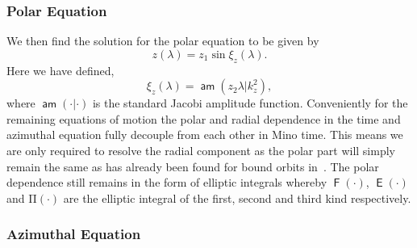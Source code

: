\documentclass[12pt, amsmath]{revtex4-2}
\newcommand\lam{\lambda}
\DeclareMathOperator{\am}{\mathsf{am}}
\newcommand{\elE}{\operatorname{\mathsf{E}}}%
\newcommand{\elF}{\operatorname{\mathsf{F}}}%
\begin{document}
\subsubsection{Polar Equation}
We then find the solution for the polar equation to be given by 
\begin{equation}\label{Eq:ISSOPolar}
    z(\lambda) = z_1 \sin{\xi_z(\lam)}.
\end{equation}
Here we have defined,
\begin{equation}
    \xi_z(\lam)= \am(z_2 \lam| k_z^2),
\end{equation}
where $\am(\cdot|\cdot)$ is the standard Jacobi amplitude function. 
Conveniently for the remaining equations of motion the polar and radial dependence in the time and azimuthal equation fully decouple from each other in Mino time. This means we are only required to resolve the radial component as the polar part will simply remain the same as has already been found for bound orbits in~\cite{Fujita:2009bp,vandeMeent:2019cam}. The polar dependence still remains in the form of elliptic integrals whereby $\elF(\cdot)$, $\elE(\cdot)$ and $\mathrm{\Pi}(\cdot)$ are the elliptic integral of the first, second and third kind respectively.
\subsubsection{Azimuthal Equation}
\end{document}
